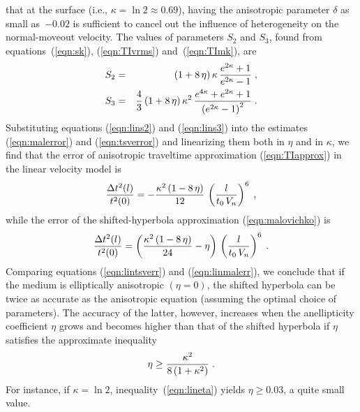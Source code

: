 that at the surface (i.e., $\kappa = \ln 2 \approx 0.69$), 
having the anisotropic
parameter $\delta$ as small as~$-0.02$ is sufficient to cancel out the
influence of heterogeneity on the normal-moveout velocity.  The values of
parameters $S_2$ and $S_3$, found from equations~(\ref{eqn:sk}), (\ref{eqn:TIvrms}) and~(\ref{eqn:TImk}), are
\begin{eqnarray}
S_2 & = & (1 + 8\,\eta)\,\kappa\,{{e^{2\kappa}+1} \over {e^{2\kappa} - 1}}\;,
\label{eqn:lins2} \\
S_3 & = & {4 \over 3}\,
(1 + 8\,\eta)\,\kappa^2\,{{e^{4\kappa} + e^{2\kappa}+1} \over 
{\left(e^{2\kappa} - 1\right)^2}}\;.
\label{eqn:lins3}
\end{eqnarray} 
Substituting equations (\ref{eqn:lins2}) and (\ref{eqn:lins3}) into 
the estimates (\ref{eqn:malerror}) and (\ref{eqn:tsverror}) and linearizing 
them both in $\eta$ and in $\kappa$, we
find that the error of anisotropic traveltime approximation
(\ref{eqn:TIapprox}) in the linear velocity model is 
\begin{equation}
{{\Delta t^2(l)} \over t^2(0)} = 
-{{\kappa^2\,(1 - 8\,\eta)} \over 12}\,
\left({l \over {t_0\,V_n}}\right)^6\;,
\label{eqn:lintsverr}
\end{equation}
while the error of the shifted-hyperbola approximation
(\ref{eqn:malovichko}) is
\begin{equation}
{{\Delta t^2(l)} \over t^2(0)} = 
\left({{\kappa^2\,(1 - 8\,\eta)} \over 24} - \eta\right)\,
\left({l \over {t_0\,V_n}}\right)^6\;.
\label{eqn:linmalerr}
\end{equation}
Comparing 
equations (\ref{eqn:lintsverr}) and (\ref{eqn:linmalerr}), we 
conclude that if the medium is elliptically anisotropic $(\eta=0)$, 
the shifted hyperbola can be twice as accurate as the anisotropic equation 
(assuming the optimal choice of parameters). The accuracy of the latter,
however, increases when the anellipticity coefficient $\eta$ grows and
becomes higher than that of the shifted hyperbola if $\eta$ satisfies
the approximate inequality 
\begin{equation}
\eta \geq {\kappa^2 \over {8\,(1 + \kappa^2)}}\;.
\label{eqn:lineta}
\end{equation}
For instance, if $\kappa = \ln 2$, inequality~(\ref{eqn:lineta}) yields
$\eta \geq 0.03$, a quite small value.

